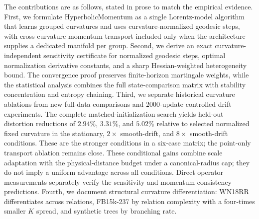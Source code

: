 The contributions are as follows, stated in prose to match the empirical evidence. First, we formulate HyperbolicMomentum as a single Lorentz-model algorithm that learns grouped curvatures and uses curvature-normalized geodesic steps, with cross-curvature momentum transport included only when the architecture supplies a dedicated manifold per group. Second, we derive an exact curvature-independent sensitivity certificate for normalized geodesic steps, optimal normalization derivative constants, and a sharp Hessian-weighted heterogeneity bound. The convergence proof preserves finite-horizon martingale weights, while the statistical analysis combines the full state-comparison matrix with stability concentration and entropy chaining. Third, we separate historical curvature ablations from new full-data comparisons and 2000-update controlled drift experiments. The complete matched-initialization search yields held-out distortion reductions of $2.94\%$, $3.31\%$, and $5.02\%$ relative to selected normalized fixed curvature in the stationary, $2\times$ smooth-drift, and $8\times$ smooth-drift conditions. These are the stronger conditions in a six-case matrix; the point-only transport ablation remains close. These conditional gains combine scale adaptation with the physical-distance budget under a canonical-radius cap; they do not imply a uniform advantage across all conditions. Direct operator measurements separately verify the sensitivity and momentum-consistency predictions. Fourth, we document structural curvature differentiation: WN18RR differentiates across relations, FB15k-237 by relation complexity with a four-times smaller $K$ spread, and synthetic trees by branching rate.
